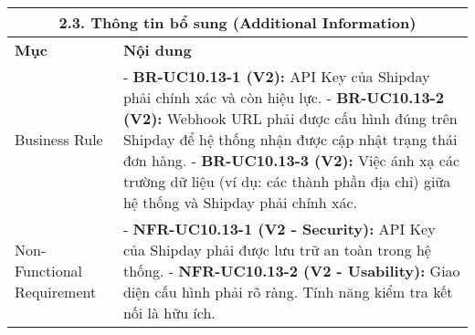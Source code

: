 \begin{longtable}{|m{4cm}|p{11cm}|}
\hline
\multicolumn{2}{|c|}{\textbf{2.3. Thông tin bổ sung (Additional Information)}} \\
\hline
\textbf{Mục} & \textbf{Nội dung} \\
\hline
Business Rule & - \textbf{BR-UC10.13-1 (V2):} API Key của Shipday phải chính xác và còn hiệu lực. \newline - \textbf{BR-UC10.13-2 (V2):} Webhook URL phải được cấu hình đúng trên Shipday để hệ thống nhận được cập nhật trạng thái đơn hàng. \newline - \textbf{BR-UC10.13-3 (V2):} Việc ánh xạ các trường dữ liệu (ví dụ: các thành phần địa chỉ) giữa hệ thống và Shipday phải chính xác. \\
\hline
Non-Functional Requirement & - \textbf{NFR-UC10.13-1 (V2 - Security):} API Key của Shipday phải được lưu trữ an toàn trong hệ thống. \newline - \textbf{NFR-UC10.13-2 (V2 - Usability):} Giao diện cấu hình phải rõ ràng. Tính năng kiểm tra kết nối là hữu ích. \\
\hline
\end{longtable}

